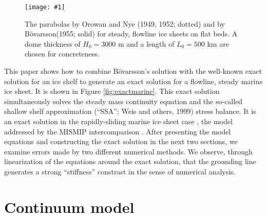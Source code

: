 \documentclass[twocolumn,letterpaper]{igs}
\renewcommand{\dh}{\fontencoding{T1}\selectfont{\symbol{240}}}
\newcommand{\onecol}[1]{\texttt{[image: \#1]}}
\newcommand{\bod}{B\"o\dh varsson\xspace}
\begin{document}
\begin{figure}[ht]
\onecol{twoparabolas}
\caption{The parabolas by Orowan and Nye (1949, 1952; dotted) and by \bod (1955; solid) for steady, flowline ice sheets on flat beds.  A dome thickness of $H_0=3000$ m and a length of $L_0=500$ km are chosen for concreteness.} \label{fig:twoparabolas}
\end{figure}

This paper shows how to combine \bod's solution with the well-known exact solution for an ice shelf \citep{vanderVeen83,vanderVeen} to generate an exact solution for a flowline, steady marine ice sheet.  It is shown in Figure \ref{fig:exactmarine}.  This exact solution simultaneously solves the steady mass continuity equation and the so-called shallow shelf approximation (``SSA''; Weis and others, 1999)\nocite{WeisGreveHutter} stress balance.  It is an exact solution in the rapidly-sliding marine ice sheet case \citep{SchoofMarine1}, the model addressed by the MISMIP intercomparison \citep{MISMIP2012}.  After presenting the model equations and constructing the exact solution in the next two sections, we examine errors made by two different numerical methods.  We observe, through linearization of the equations around the exact solution, that the grounding line generates a strong ``stiffness'' constrast in the sense of numerical analysis.


\section{Continuum model}
\end{document}
